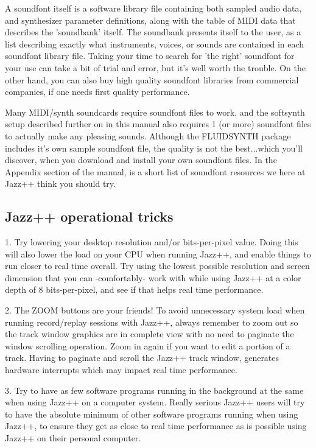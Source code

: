 \documentclass[letterpaper]{report}
\begin{document}
A soundfont itself is a software library file containing both sampled audio
data, and synthesizer parameter definitions, along with the table of MIDI data
that describes the 'soundbank' itself. The soundbank presents itself to the
user, as a list describing exactly what instruments, voices, or sounds are
contained in each soundfont library file. Taking your time to search for 'the
right' soundfont for your use can take a bit of trial and error, but it's well
worth the trouble. On the other hand, you can also buy high quality soundfont
libraries from commercial companies, if one needs first quality performance.

Many MIDI/synth soundcards require soundfont files to work, and the softsynth
setup described further on in this manual also requires 1 (or more) soundfont
files to actually make any pleasing sounds. Although the FLUIDSYNTH package
includes it's own sample soundfont file, the quality is not the best...which
you'll discover, when you download and install your own soundfont files. In the
Appendix section of the manual, is a short list of soundfont resources we here
at Jazz++ think you should try. 


\subsection{Jazz++ operational tricks}

1. Try lowering your desktop resolution and/or bits-per-pixel value. Doing this
will also lower the load on your CPU when running Jazz++, and enable things to
run closer to real time overall. Try using the lowest possible resolution and
screen dimension that you can -comfortably- work with while using Jazz++ at a
color depth of 8 bits-per-pixel, and see if that helps real time performance.

2. The ZOOM buttons are your friends! To avoid unnecessary system load when
running record/replay sessions with Jazz++, always remember to zoom out so the
track window graphics are in complete view with no need to paginate the window
scrolling operation. Zoom in again if you want to edit a portion of a track.
Having to paginate and scroll the Jazz++ track window, generates hardware
interrupts which may impact real time performance.

3. Try to have as few software programs running in the background at the same
when using Jazz++ on a computer system. Really serious Jazz++ users will try to
have the absolute minimum of other software programs running when using Jazz++,
to ensure they get as close to real time performance as is possible using Jazz++
on their personal computer.
\end{document}

